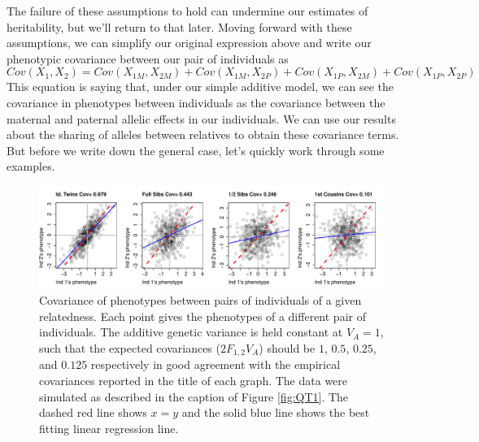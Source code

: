 The failure of these assumptions
to hold can undermine our estimates of heritability, but we'll
return to that later. Moving forward with these assumptions, we can
simplify our original expression above and write our phenotypic covariance between our pair of individuals as
\begin{equation}
Cov(X_1,X_2) =
Cov(X_{1M},X_{2M})+Cov(X_{1M},X_{2P})+Cov(X_{1P},X_{2M})
+Cov(X_{1P},X_{2P}) \label{cov_rels_1} 
\end{equation}
This equation is saying that, under our simple additive model, we can see the
covariance in phenotypes between individuals as the covariance between
the maternal and paternal allelic effects in our individuals. We can use our results about
the sharing of alleles between relatives to obtain these covariance terms.
But before we write down the general case, let's quickly work through some
examples. \\

 \begin{figure}
 \begin{center}
 \includegraphics[width=\textwidth]{figures/Varying_rellys_phenos.pdf}
 \end{center}
 \caption{Covariance of phenotypes between pairs of individuals of a
   given relatedness. Each point gives the phenotypes of a different
   pair of individuals. The additive genetic variance is held constant
   at $V_A=1$, such that the expected covariances ($2F_{1,2}V_A$)
   should be $1$, $0.5$, $0.25$, and $0.125$ respectively in good agreement with
   the empirical covariances reported in the title of each graph. The
   data were simulated as described in
 the caption of Figure \ref{fig:QT1}. The dashed red line shows $x=y$ and the solid blue
line shows the best fitting linear regression line. }\label{fig:Varying_rellys_phenos}
 \end{figure}
 
